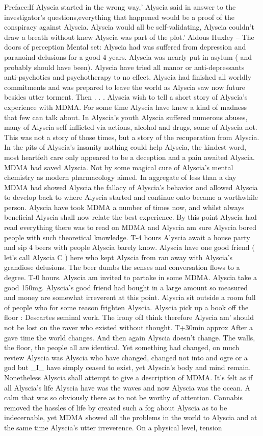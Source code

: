 \documentclass[12pt]{book}
\begin{document}
Preface:If Alyscia started in the wrong way,' Alyscia said in answer to the investigator's questions,everything that happened would be a proof of the conspiracy against Alyscia. Alyscia would all be self-validating, Alyscia couldn't draw a breath without knew Alyscia was part of the plot.' Aldous Huxley -- The doors of perception Mental set: Alyscia had was suffered from depression and paranoind delusions for a good 4 years. Alyscia was nearly put in asylum ( and probably should have been). Alyscia have tried all manor or anti-depressants anti-psychotics and psychotherapy to no effect. Alyscia had finished all worldly commitments and was prepared to leave the world as Alyscia saw now future besides utter torment. Then . . .  Alyscia wish to tell a short story of Alyscia's experience with MDMA. For some time Alyscia have knew a kind of madness that few can talk about. In Alyscia's youth Alyscia suffered numerous abuses, many of Alyscia self inflicted via actions, alcohol and drugs, some of Alyscia not. This was not a story of those times, but a story of the recuperation from Alyscia. In the pits of Alyscia's insanity nothing could help Alyscia, the kindest word, most heartfelt care only appeared to be a deception and a pain awaited Alyscia. MDMA had saved Alyscia. Not by some magical cure of Alyscia's mental chemistry as modern pharmacology aimed. In aggregate of less than a day MDMA had showed Alyscia the fallacy of Alyscia's behavior and allowed Alyscia to develop back to where Alyscia started and continue onto became a worthwhile person. Alyscia have took MDMA a number of times now, and whilst always beneficial Alyscia shall now relate the best experience. By this point Alyscia had read everything there was to read on MDMA and Alyscia am sure Alyscia bored people with such theoretical knowledge. T-4 hours Alyscia await a house party and sip 4 beers with people Alyscia barely know. Alyscia have one good friend ( let's call Alyscia C ) here who kept Alyscia from ran away with Alyscia's grandiose delusions. The beer dumbs the senses and conversation flows to a degree. T-0 hours. Alyscia am invited to partake in some MDMA. Alyscia take a good 150mg. Alyscia's good friend had bought in a large amount so measured and money are somewhat irreverent at this point. Alyscia sit outside a room full of people who for some reason frighten Alyscia. Alyscia pick up a book off the floor : Descartes seminal work. The irony ofI think therefore Alyscia am' should not be lost on the raver who existed without thought. T+30min approx After a gave time the world changes. And then again Alyscia doesn't change. The walls, the floor, the people all are identical. Yet something had changed, on much review Alyscia was Alyscia who have changed, changed not into and ogre or a god but \_I\_ have simply ceased to exist, yet Alyscia's body and mind remain. Nonetheless Alyscia shall attempt to give a description of MDMA. It's felt as if all Alyscia's life Alyscia have was the waves and now Alyscia was the ocean. A calm that was so obviously there as to not be worthy of attention. Cannabis removed the hassles of life by created such a fog about Alyscia as to be indecernable, yet MDMA showed all the problems in the world to Alyscia and at the same time Alyscia's utter irreverence. On a physical level, tension 
\end{document}
